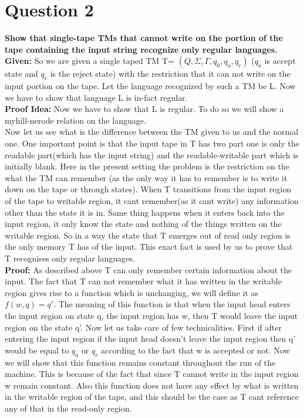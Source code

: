 \documentclass{article}
\begin{document}
\section{Question 2}
\textbf{Show that single-tape TMs that cannot write on the portion of the tape containing the input string recognize only regular languages.}\\
\newline 
\textbf{Given:} So we are given a single taped TM T= $(Q, \Sigma, \Gamma, q_0, q_a, q_r)$ ($q_a$ is accept state and $q_r$ is the reject state) with the restriction that it can not write on the input portion on the tape. Let the language recognized by such a TM be L. Now we have to show that language L is in-fact regular. \\
\textbf{Proof Idea:} Now we have to show that L is regular. To do so we will show a myhill-nerode relation on the language.\\
Now let us see what is the difference between the TM given to us and the normal one. One important point is that the input tape in T has two part one is only the readable part(which has the input string) and the readable-writable part which is initially blank. Here in the present setting the problem is the restriction on the what the TM can remember (as the only way it has to remember is to write it down on the tape or through states). When T transitions from the input region of the tape to writable region, it cant remember(as it cant write) any information other than the state it is in. Same thing happens when it enters back into the input region, it only know the state and nothing of the things written on the writable region. So in a way the state that T emerges out of read only region is the only memory T has of the input. This exact fact is used by us to prove that T recognises only regular languages. \\
\textbf{Proof:} As described above T can only remember certain information about the input. The fact that T can not remember what it has written in the writable region gives rise to a function which is unchanging, we will define it as $f(w,q)=q'$. The meaning of this function is that when the input head enters the input region on state q, the input region has w, then T would leave the input region on the state q'. Now let us take care of few technicalities. First if after entering the input region if the input head doesn't leave the input region then q' would be equal to $q_a$ or $q_r$ according to the fact that w is accepted or not. Now we will show that this function remains constant throughout the run of the machine. This is because of the fact that since T cannot write in the input region w remain constant. Also this function does not have any effect by what is written in the writable region of the tape, and this should be the case as T cant reference any of that in the read-only region.\\
\end{document}
